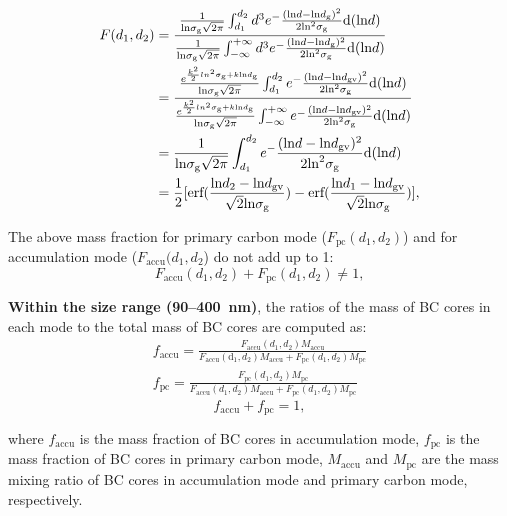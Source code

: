 \documentclass[12pt]{article}
\begin{document}
	\begin{align*}
	F(d_{1}, d_{2}) &= \frac{\frac{1}{\text{ln}\sigma_{\text{g}}\sqrt{2\pi}}\int_{d_{1}}^{d_{2}}d^3e^-\frac{(\text{ln}d - \text{ln}d_{\rm g})^2}{2\text{ln}^2\sigma_{\text{g}}}\text{d}(\text{ln}d)}
	{\frac{1}{\text{ln}\sigma_{\text{g}}\sqrt{2\pi}}\int_{-\infty}^{+\infty}d^3e^-\frac{(\text{ln}d - \text{ln}d_{\rm g})^2}{2\text{ln}^2\sigma_{\text{g}}}\text{d}(\text{ln}d)}  \\
	&=\frac{\frac{e^{\frac{k^2}{2}ln^2\sigma_{\rm g}+k\text{ln}d_{\rm g}}}{\text{ln}\sigma_{\text{g}}\sqrt{2\pi}}\int_{d_{1}}^{d_{2}}e^-\frac{(\text{ln}d - \text{ln}d_{\text{gv}})^2}{2\text{ln}^2\sigma_{\text{g}}}\text{d}(\text{ln}d)}{\frac{e^{\frac{k^2}{2}ln^2\sigma_{\rm g}+k\text{ln}d_{\rm g}}}{\text{ln}\sigma_{\text{g}}\sqrt{2\pi}}\int_{-\infty}^{+\infty}e^-\frac{(\text{ln}d - \text{ln}d_{\text{gv}})^2}{2\text{ln}^2\sigma_{\text{g}}}\text{d}(\text{ln}d)}\\
	&=\frac{1}{\text{ln}\sigma_{\text{g}}\sqrt{2\pi}}\int_{d_{1}}^{d_{2}}e^-\frac{(\text{ln}d - \text{ln}d_{\text{gv}})^2}{2\text{ln}^2\sigma_{\text{g}}}\text{d}(\text{ln}d) \\
	&=\frac{1}{2}[\text{erf}(\frac{\text{ln}d_{2} - \text{ln}d_{\text{gv}}}{\sqrt{2}\text{ln}\sigma_{\rm g}})-\text{erf}(\frac{\text{ln}d_{1} - \text{ln}d_{\text{gv}}}{\sqrt{2}\text{ln}\sigma_{\rm g}})],
	\end{align*}
	
	The above mass fraction for primary carbon mode ($F_{\text{pc}}(d_{1}, d_{2})$) and for accumulation mode ($F_{\text{accu}}(d_{1}, d_{2}$) do not add up to 1:
	\[F_{\text{accu}}(d_{1}, d_{2}) + F_{\text{pc}}(d_{1}, d_{2}) \neq 1,\]
	
	
	
	\textbf{Within the size range (90--400~nm)}, the ratios of the mass of BC cores in each mode to the total mass of BC cores are computed as:
	\begin{align*}
	f_{\text{accu}} = \frac{F_{\text{accu}}(d_{1}, d_{2})M_{\text{accu}}}{F_{\text{accu}}(\text{d}_{1}, d_{2})M_{\text{accu}}+F_{\text{pc}}(d_{1}, d_{2})M_{\text{pc}}}\\
	f_{\text{pc}} = \frac{F_{\text{pc}}(d_{1}, d_{2})M_{\text{pc}}}{F_{\text{accu}}(d_{1}, d_{2})M_{\text{accu}}+F_{\text{pc}}(d_{1}, d_{2})M_{\text{pc}}}
	\end{align*}
	\[f_{\text{accu}} + f_{\text{pc}} = 1,\]
	
	where $f_{\text{accu}}$ is the mass fraction of BC cores in
	accumulation mode, $f_{\text{pc}}$ is the mass fraction of BC cores in
	primary carbon mode, $M_{\text{accu}}$ and $M_{\text{pc}}$ are the mass mixing ratio of BC cores
	in accumulation mode and primary carbon mode, respectively.
	
\end{document}
